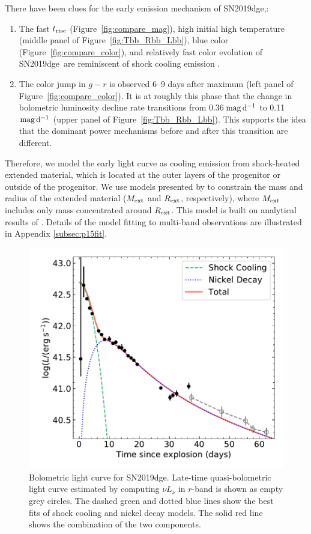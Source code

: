 \documentclass[twocolumn]{aastex63}
\newcommand{\name}{SN2019dge}
\begin{document}
\begin{CJK*}{UTF8}{gbsn}
There have been clues for the early emission mechanism of \name,:
\begin{enumerate}[label=(\roman*)]
	\item The fast $t_{\rm rise}$ (Figure~\ref{fig:compare_mag}), high initial high temperature (middle 
	panel of Figure~\ref{fig:Tbb_Rbb_Lbb}), blue color (Figure~\ref{fig:compare_color}), and relatively 
	fast color evolution of \name\ are reminiscent of shock cooling emission \citep{Nakar2014, Piro2015}.
	\item The color jump in $g-r$ is observed 6--9 days after maximum (left panel of 
	Figure~\ref{fig:compare_color}). It is at roughly this phase that the change in bolometric luminosity 
	decline rate transitions from 0.36\,$\rm mag\, d^{-1}$ to 0.11 $\rm mag\, d^{-1}$
	(upper panel of Figure~\ref{fig:Tbb_Rbb_Lbb}). This supports the idea that the dominant power 
	mechanisms before and after this transition are different.
\end{enumerate}

Therefore, we model the early light curve as cooling emission from shock-heated extended material, 
which is located at the outer layers of the progenitor or outside of the progenitor. We use models 
presented by \citet[][hereafter P15]{Piro2015} to constrain the mass and radius of the extended 
material ($M_{\rm ext}$ and $R_{\rm ext}$, respectively), where $M_{\rm ext}$ includes only mass 
concentrated around $R_{\rm ext}$. This model is built on analytical results of \citet{Nakar2014}. 
Details of the model fitting to multi-band observations are illustrated in Appendix \ref{subsec:p15fit}. 
\begin{figure}
	\centering
	\includegraphics[width=\columnwidth]{figures/Lbb.pdf}
	\caption{Bolometric light curve for \name. Late-time quasi-bolometric light curve 
	estimated by computing $\nu L_\nu$ in $r$-band is shown as empty grey circles. The dashed green 
	and dotted blue lines show the best fits of shock cooling and nickel decay models. The solid red line 
	shows the combination of the two components.}
	\label{fig:Lbb}
\end{figure}


\end{CJK*}
\end{document}
